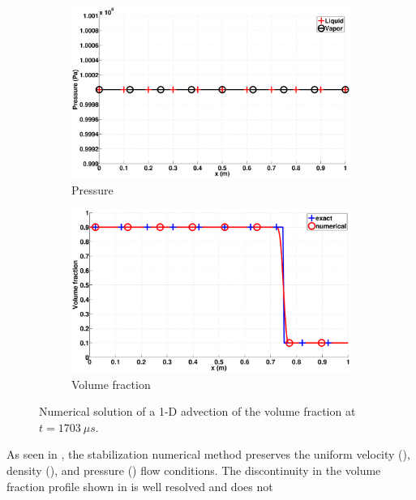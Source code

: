 \documentclass[preprint,10pt]{elsarticle}
\begin{document}
\begin{figure}[H]
        \begin{subfigure}[b]{0.495\textwidth}
                \centering
                \includegraphics[width=\textwidth]{figures/vf-shock_two_phases_pressure.eps}
                \caption{Pressure}
                \label{fig:adv-vf-press}
        \end{subfigure}        
        \begin{subfigure}[b]{0.495\textwidth}
                \centering
                \includegraphics[width=\textwidth]{figures/advection-vol-fraction.eps}
                \caption{Volume fraction}
                \label{fig:adv-vf-vf}
        \end{subfigure}
        \caption{Numerical solution of a 1-D advection of the volume fraction at $t=1703 \ \mu s$.}\label{fig:adv-vf-variables}
\end{figure}
%
As seen in , the stabilization numerical method preserves the uniform velocity (), density (),
and pressure () flow conditions. The discontinuity in the volume fraction profile shown in  is well resolved and does not 
\end{document}
